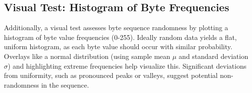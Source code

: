 \subsection{Visual Test: Histogram of Byte Frequencies}

Additionally, a visual test assesses byte sequence randomness by plotting a histogram of byte value frequencies (0-255). Ideally random data yields a flat, uniform histogram, as each byte value should occur with similar probability. Overlays like a normal distribution (using sample mean $\mu$ and standard deviation $\sigma$) and highlighting extreme frequencies help visualize this. Significant deviations from uniformity, such as pronounced peaks or valleys, suggest potential non-randomness in the sequence.

